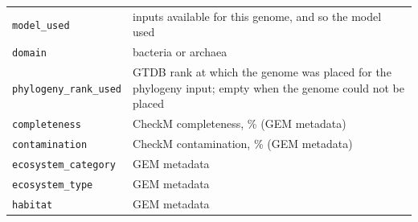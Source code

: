 \begin{longtable}{p{5.9cm}p{9.9cm}}
\texttt{model\_used} & inputs available for this genome, and so the model used \\
\texttt{domain} & bacteria or archaea \\
\texttt{phylogeny\_rank\_used} & GTDB rank at which the genome was placed for the phylogeny input; empty when the genome could not be placed \\
\texttt{completeness} & CheckM completeness, \% (GEM metadata) \\
\texttt{contamination} & CheckM contamination, \% (GEM metadata) \\
\texttt{ecosystem\_category} & GEM metadata \\
\texttt{ecosystem\_type} & GEM metadata \\
\texttt{habitat} & GEM metadata \\
\bottomrule
\end{longtable}
